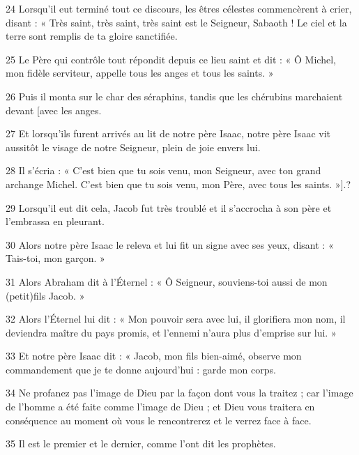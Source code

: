 \par 24 Lorsqu'il eut terminé tout ce discours, les êtres célestes commencèrent à crier, disant : « Très saint, très saint, très saint est le Seigneur, Sabaoth ! Le ciel et la terre sont remplis de ta gloire sanctifiée.

\par 25 Le Père qui contrôle tout répondit depuis ce lieu saint et dit : « Ô Michel, mon fidèle serviteur, appelle tous les anges et tous les saints. »

\par 26 Puis il monta sur le char des séraphins, tandis que les chérubins marchaient devant [avec les anges.

\par 27 Et lorsqu'ils furent arrivés au lit de notre père Isaac, notre père Isaac vit aussitôt le visage de notre Seigneur, plein de joie envers lui.

\par 28 Il s'écria : « C'est bien que tu sois venu, mon Seigneur, avec ton grand archange Michel. C'est bien que tu sois venu, mon Père, avec tous les saints. »].?

\par 29 Lorsqu'il eut dit cela, Jacob fut très troublé et il s'accrocha à son père et l'embrassa en pleurant.

\par 30 Alors notre père Isaac le releva et lui fit un signe avec ses yeux, disant : « Tais-toi, mon garçon. »

\par 31 Alors Abraham dit à l'Éternel : « Ô Seigneur, souviens-toi aussi de mon (petit)fils Jacob. »

\par 32 Alors l'Éternel lui dit : « Mon pouvoir sera avec lui, il glorifiera mon nom, il deviendra maître du pays promis, et l'ennemi n'aura plus d'emprise sur lui. »

\par 33 Et notre père Isaac dit : « Jacob, mon fils bien-aimé, observe mon commandement que je te donne aujourd'hui : garde mon corps.

\par 34 Ne profanez pas l'image de Dieu par la façon dont vous la traitez ; car l’image de l’homme a été faite comme l’image de Dieu ; et Dieu vous traitera en conséquence au moment où vous le rencontrerez et le verrez face à face.

\par 35 Il est le premier et le dernier, comme l'ont dit les prophètes.

